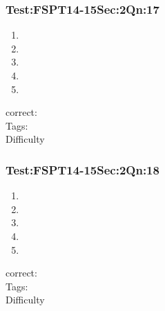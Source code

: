 \documentclass[]{beamer}
\begin{document}
    \begin{frame}
	    \frametitle{Test:FSPT14-15\hspace{2mm}Sec:2\hspace{2mm}Qn:17}
	       
	    \begin{enumerate}
	        \item
	            	
	        \item
	            
	        \item
	            
	        \item
	            
	        \item
	            
	    \end{enumerate}
	    correct:  \\   
	    Tags:    \\
	    Difficulty   \\
    \end{frame}
    \begin{frame}
	    \frametitle{Test:FSPT14-15\hspace{2mm}Sec:2\hspace{2mm}Qn:18}
	       
	    \begin{enumerate}
	        \item
	            	
	        \item
	            
	        \item
	            
	        \item
	            
	        \item
	            
	    \end{enumerate}
	    correct:  \\   
	    Tags:    \\
	    Difficulty   \\
    \end{frame}
\end{document}
